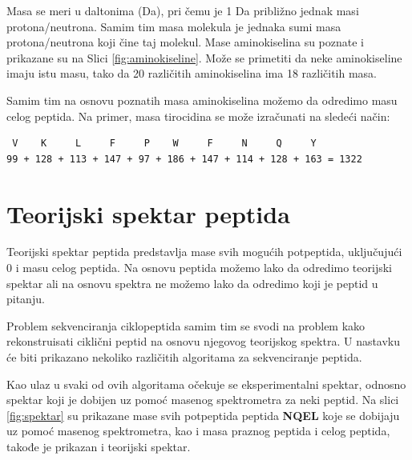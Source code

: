 \documentclass[12pt,oneside]{memoir}
\begin{document}
Masa se meri u daltonima (Da), pri čemu je 1 Da približno jednak masi protona/neutrona. Samim tim masa molekula je jednaka sumi masa protona/neutrona koji čine taj molekul. Mase aminokiselina su poznate i prikazane su na Slici \ref{fig:aminokiseline}. Može se primetiti da neke aminokiseline imaju istu masu, tako da 20 različitih aminokiselina ima 18 različitih masa.

Samim tim na osnovu poznatih masa aminokiselina možemo da odredimo masu celog peptida. Na primer, masa tirocidina se može izračunati na sledeći način:
\begin{verbatim}
 V    K     L     F     P    W     F     N     Q     Y     
99 + 128 + 113 + 147 + 97 + 186 + 147 + 114 + 128 + 163 = 1322
\end{verbatim}

\section{Teorijski spektar peptida}
Teorijski spektar peptida predstavlja mase svih mogućih potpeptida, uključujući 0 i masu celog peptida. Na osnovu peptida možemo lako da odredimo teorijski spektar ali na osnovu spektra ne možemo lako da odredimo koji je peptid u pitanju.

Problem sekvenciranja ciklopeptida samim tim se svodi na problem kako rekonstruisati ciklični peptid na osnovu njegovog teorijskog spektra. U nastavku će biti prikazano nekoliko različitih algoritama za sekvenciranje peptida.

Kao ulaz u svaki od ovih algoritama očekuje se eksperimentalni spektar, odnosno spektar koji je dobijen uz pomoć masenog spektrometra za neki peptid. Na slici \ref{fig:spektar} su prikazane mase svih potpeptida peptida \textbf{NQEL} koje se dobijaju uz pomoć masenog spektrometra, kao i masa praznog peptida i celog peptida, takođe je prikazan i teorijski spektar.
\end{document}
